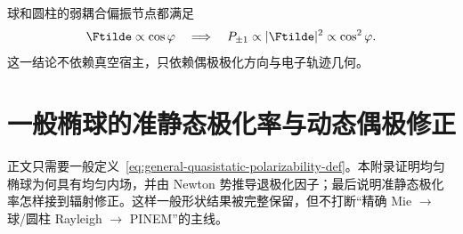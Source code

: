 球和圆柱的弱耦合偏振节点都满足
\begin{equation}
\Ftilde\propto\cos\varphi
\quad\Longrightarrow\quad
P_{\pm1}\propto|\Ftilde|^2\propto\cos^2\varphi.
\end{equation}
这一结论不依赖真空宿主，只依赖偶极极化方向与电子轨迹几何。


\section{一般椭球的准静态极化率与动态偶极修正}
\label{app:ellipsoid-rayleigh}

正文只需要一般定义~\eqref{eq:general-quasistatic-polarizability-def}。本附录证明均匀椭球为何具有均匀内场，并由 Newton 势推导退极化因子；最后说明准静态极化率怎样接到辐射修正。这样一般形状结果被完整保留，但不打断“精确 Mie $\to$ 球/圆柱 Rayleigh $\to$ PINEM”的主线。

